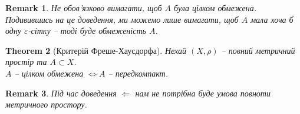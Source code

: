 \documentclass[a4paper, 10pt]{article}
\def\leftproof{$\boxed{\Leftarrow}$ }
\theoremstyle{theoremdd}
\newtheorem{theorem}{Theorem}[subsection]
\theoremstyle{theoremdd}
\theoremstyle{theoremdd}
\theoremstyle{theoremdd}
\theoremstyle{theoremdd}
\theoremstyle{theoremdd}
\newtheorem{remark}[theorem]{Remark}
\theoremstyle{theoremdd}
\theoremstyle{theoremdd}
\begin{document}
\begin{remark}
Не обов'язково вимагати, щоб $A$ була цілком обмежена. Подивившись на це доведення, ми можемо лише вимагати, щоб $A$ мала хоча б одну $\varepsilon$-сітку -- тоді буде обмеженість $A$.
\end{remark}

\begin{theorem}[Критерій Фреше-Хаусдорфа]
Нехай $(X,\rho)$ -- повний метричний простір та $A \subset X$.\\
$A$ -- цілком обмежена $\iff A$ -- передкомпакт.
\end{theorem}

\begin{remark}
Під час доведення \leftproof нам не потрібна буде умова повноти метричного простору.
\end{remark}
\end{document}

